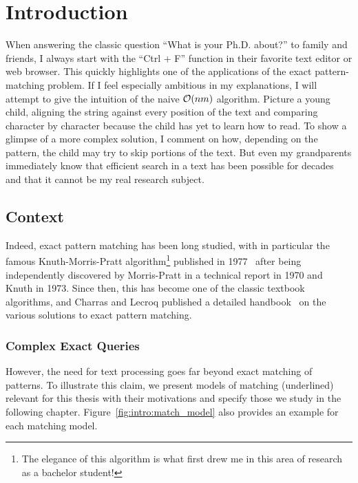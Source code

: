 \chapter*{Introduction}\label{chap:intro}\setcounter{page}{1}\frontmatter
{}

When answering the classic question ``What is your Ph.D. about?'' to family and friends, I always start with the ``Ctrl + F'' function in their favorite text editor or web browser. This quickly highlights one of the applications of the exact pattern-matching problem. If I feel especially ambitious in my explanations, I will attempt to give the intuition of the naive $\mathcal{O}(nm)$ algorithm. Picture a young child, aligning the string against every position of the text and comparing character by character because the child has yet to learn how to read. To show a glimpse of a more complex solution, I comment on how, depending on the pattern, the child may try to skip portions of the text. But even my grandparents immediately know that efficient search in a text has been possible for decades and that it cannot be my real research subject.

\section{Context}

Indeed, exact pattern matching has been long studied, with in particular the famous Knuth-Morris-Pratt algorithm\footnote{The elegance of this algorithm is what first drew me in this area of research as a bachelor student!} published in 1977~\cite{KMP} after being independently discovered by Morris-Pratt in a technical report in 1970 and Knuth in 1973. Since then, this has become one of the classic textbook algorithms, and Charras and Lecroq published a detailed handbook~\cite{charras2004handbook} on the various solutions to exact pattern matching.

\subsection{Complex Exact Queries}\label{sec:intro:complex}



However, the need for text processing goes far beyond exact matching of patterns. To illustrate this claim, we present models of matching (underlined) relevant for this thesis with their motivations and specify those we study in the following chapter. Figure~\ref{fig:intro:match_model} also provides an example for each matching model.

